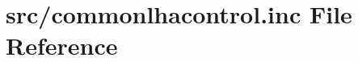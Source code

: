 \hypertarget{commonlhacontrol_8inc}{}\section{src/commonlhacontrol.inc File Reference}
\label{commonlhacontrol_8inc}
